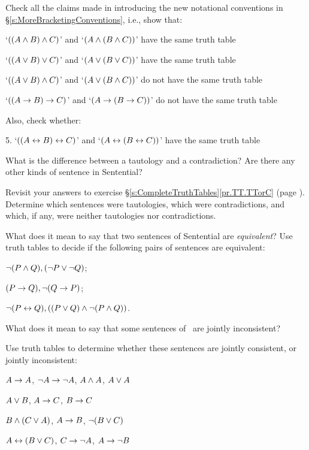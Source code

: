 \practiceproblems
\problempart
Check all the claims made in introducing the new notational conventions in §\ref{s:MoreBracketingConventions}, i.e., show that:
\begin{earg}
	\item `$((A \wedge B) \wedge C)$' and `$(A \wedge (B \wedge C))$' have the same truth table
	\item `$((A \vee B) \vee C)$' and `$(A \vee (B \vee C))$' have the same truth table
	\item `$((A \vee B) \wedge C)$' and `$(A \vee (B \wedge C))$' do not have the same truth table
	\item `$((A \rightarrow B) \rightarrow C)$' and `$(A \rightarrow (B \rightarrow C))$' do not have the same truth table
\end{earg}
Also, check whether:
\begin{earg}
	\item[5.] `$((A \leftrightarrow B) \leftrightarrow C)$' and `$(A \leftrightarrow (B \leftrightarrow C))$' have the same truth table
\end{earg}
\problempart
What is the difference between a tautology and a contradiction? Are there any other kinds of sentence in Sentential?

Revisit your answers to exercise §\ref{s:CompleteTruthTables}\ref{pr.TT.TTorC} (page \pageref{pr.TT.TTorC.p}). Determine which sentences were tautologies, which were contradictions, and which, if any, were neither tautologies nor contradictions.

\problempart
What does  it  mean  to  say  that  two sentences  of  Sentential  are \emph{equivalent}? Use  truth  tables  to  decide  if  the  following  pairs  of sentences are equivalent:
\begin{earg}
	\item $\neg(P \wedge Q), (\neg P \vee \neg Q)$;
	\item $(P \rightarrow Q), \neg(Q \rightarrow P)$;
	\item $\neg (P \leftrightarrow Q), ((P \vee Q) \wedge \neg (P \wedge Q))$.
\end{earg}

\problempart
\label{pr.TT.consistent} What does it mean to say that some sentences of \TFL\ are jointly inconsistent?

Use truth tables to determine whether these sentences are jointly consistent, or jointly inconsistent:
\begin{earg}
\item $A\rightarrow A$, $\neg A \rightarrow \neg A$, $A\wedge A$, $A\vee A$ %
\item $A\vee B$, $A\rightarrow C$, $B\rightarrow C$ %
\item $B\wedge(C\vee A)$, $A\rightarrow B$, $\neg(B\vee C)$  %
\item $A\leftrightarrow(B\vee C)$, $C\rightarrow \neg A$, $A\rightarrow \neg B$ %
\end{earg}


